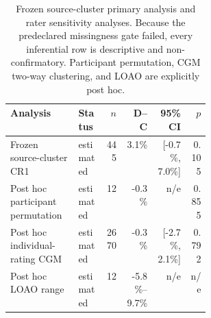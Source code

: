\begin{table}[t]
\centering\small
\caption{Frozen source-cluster primary analysis and rater sensitivity analyses. Because the predeclared missingness gate failed, every inferential row is descriptive and non-confirmatory. Participant permutation, CGM two-way clustering, and LOAO are explicitly post hoc.}
\label{tab:v3-rater-sensitivity}
\begin{tabular}{p{0.34\linewidth}lrrrr}
\toprule
Analysis & Status & $n$ & D--C & 95\% CI & $p$ \\
\midrule
Frozen source-cluster CR1 & estimated & 445 & 3.1\% & [-0.7\%, 7.0\%] & 0.105 \\
Post hoc participant permutation & estimated & 12 & -0.3\% & n/e & 0.855 \\
Post hoc individual-rating CGM & estimated & 2670 & -0.3\% & [-2.7\%, 2.1\%] & 0.792 \\
Post hoc LOAO range & estimated & 12 & -5.8\%--9.7\% & n/e & n/e \\
\bottomrule
\end{tabular}
\end{table}

